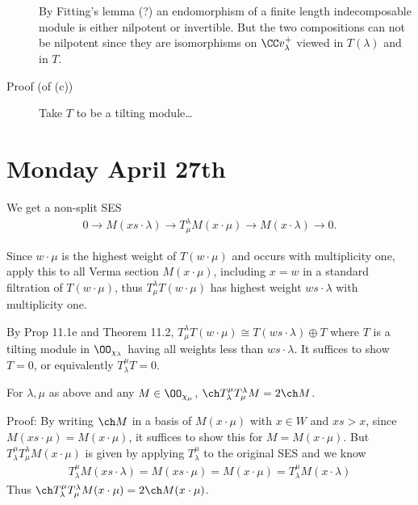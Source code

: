 \begin{description}
By Fitting's lemma (?) an endomorphism of a finite length indecomposable
module is either nilpotent or invertible. But the two compositions can
not be nilpotent since they are isomorphisms on \(\CC v_\lambda^+\)
viewed in \(T(\lambda)\) and in \(T\).
\item[Proof (of (c))]
Take \(T\) to be a tilting module\ldots{}
\end{description}

\hypertarget{monday-april-27th}{%
\section{Monday April 27th}\label{monday-april-27th}}

We get a non-split SES \begin{align*}
0 \to M(xs\cdot \lambda) \to T_\mu^\lambda M(x\cdot \mu) \to M(x\cdot \lambda) \to 0
.\end{align*}

Since \(w\cdot \mu\) is the highest weight of \(T(w\cdot \mu)\) and
occurs with multiplicity one, apply this to all Verma section
\(M(x\cdot \mu)\), including \(x= w\) in a standard filtration of
\(T(w\cdot \mu)\), thus \(T_\mu^\lambda T(w\cdot \mu)\) has highest
weight \(ws\cdot \lambda\) with multiplicity one.

By Prop 11.1e and Theorem 11.2,
\(T_\mu^\lambda T(w\cdot \mu) \cong T(ws \cdot \lambda) \oplus T\) where
\(T\) is a tilting module in \(\OO_{\chi_\lambda}\) having all weights
less than \(ws\cdot \lambda\). It suffices to show \(T=0\), or
equivalently \(T_\lambda^\mu T = 0\).

\begin{description}
\tightlist
\item[Lemma (Translating and Inverting Doubles the Character)]
For \(\lambda, \mu\) as above and any \(M\in \OO_{\chi_\mu}\),
\(\ch T_\lambda^\mu T_\mu^\lambda M = 2 \ch M\).
\end{description}

Proof: By writing \(\ch M\) in a basis of \(M(x\cdot \mu)\) with
\(x\in W\) and \(xs > x\), since \(M(xs \cdot \mu) = M(x \cdot \mu)\),
it suffices to show this for \(M = M(x\cdot \mu)\). But
\(T_\lambda^\mu T_\mu^\lambda M(x\cdot \mu)\) is given by applying
\(T_\lambda^\mu\) to the original SES and we know
\begin{align*}
T_\lambda^\mu M(xs\cdot \lambda) = M(xs \cdot \mu) = M(x\cdot \mu) = T_\lambda^\mu M(x\cdot \lambda)
\end{align*} Thus
\(\ch T_\lambda^\mu T_\mu^\lambda M(x\cdot \mu) = 2\ch M(x\cdot \mu)\).

